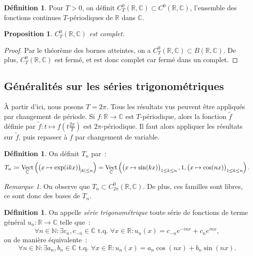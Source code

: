 \documentclass{report}
\newtheorem{prp}[thm]{Proposition}
\theoremstyle{definition}
\newtheorem{déf}[thm]{Définition}
\theoremstyle{remark}
\newtheorem*{rmq}{Remarque}
\numberwithin{equation}{section}
\newcommand{\C}{\mathbb C}
\newcommand{\R}{\mathbb R}
\newcommand{\N}{\mathbb N}
\newcommand{\tq}{\text{ t.q. }}
\DeclareMathOperator{\Vect}{Vect}
\begin{document}
			\begin{déf} Pour $T > 0$, on définit $C^0_T(\R, \C) \subset C^0(\R, \C)$, l'ensemble des fonctions continues $T$-périodiques de $\R$ dans $\C$.
			\end{déf}

			\begin{prp} $C^0_T(\R, \C)$ est complet.
			\end{prp}

			\begin{proof} Par le théorème des bornes atteintes, on a $C^0_T(\R, \C) \subset B(\R, \C)$. De plus, $C^0_T(\R, \C)$ est fermé, et est donc complet
			car fermé dans un complet.
			\end{proof}

		\subsection{Généralités sur les séries trigonométriques}
			À partir d'ici, nous posons $T = 2\pi$. Tous les résultats vus peuvent être appliqués par changement de période. Si $f : \R \to \C$ est $T$-périodique,
			alors la fonction $\widetilde f$ définie par $\widetilde f : t \mapsto f(t\frac {2\pi}T)$ est $2\pi$-périodique. Il faut alors appliquer les
			résultats sur $\widetilde f$, puis repasser à $f$ par changement de variable.

			\begin{déf} On définit $T_n$ par~:
			\begin{equation}
				T_n \coloneqq \Vect_\C\left(\left(x \mapsto \exp(ikx)\right)_{\abs k \leq n}\right) = \Vect_\C\left(\left(x \mapsto \sin(kx)\right)_{1 \leq k \leq n}, 1, \left(x \mapsto\cos(nx)\right)_{1 \leq k \leq n}\right).
			\end{equation}
			\end{déf}

			\begin{rmq} On observe que $T_n \subset C^0_{2\pi}(\R, \C)$. De plus, ces familles sont libres, ce sont donc des bases de $T_n$.
			\end{rmq}

			\begin{déf} On appelle \textit{série trigonométrique} toute série de fonctions de terme général $u_n : \R \to \C$ telle que~:
			\begin{equation}
				\forall n \in \N : \exists c_n, c_{-n} \in \C \tq \forall x \in \R : u_n(x) = c_{-n}e^{-inx} + c_ne^{inx},
			\end{equation}
			ou de manière équivalente~:
			\begin{equation}
				\forall n \in \N : \exists a_n, b_n \in \C \tq \forall x \in \R : u_n(x) = a_n\cos(nx) + b_n\sin(nx).
			\end{equation}
			\end{déf}
\end{document}

